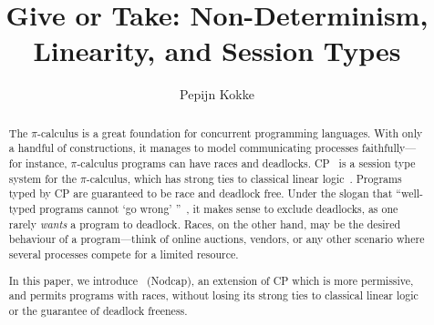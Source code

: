 \documentclass[a4paper,UKenglish]{lipics-v2016}
\title{Give or Take: Non-Determinism, Linearity, and Session Types}%
\author[1]{Pepijn Kokke}%
\affil[1]{LFCS, University of Edinburgh, Edinburgh, United Kingdom\\
  \texttt{pepijn.kokke@ed.ac.uk}}%
\begin{document}
\maketitle

\begin{abstract}
  The $\pi$-calculus is a great foundation for concurrent programming languages.
  With only a handful of constructions, it manages to model communicating
  processes faithfully---for instance, $\pi$-calculus programs can have races
  and deadlocks.
  CP~\cite{wadler2012} is a session type system for the $\pi$-calculus, which
  has strong ties to classical linear logic~\cite{girard1987}. Programs typed by
  CP are guaranteed to be race and deadlock free.
  Under the slogan that ``well-typed programs cannot `go wrong'\!\!
  ''~\cite{milner1978}, it makes sense to exclude deadlocks, as one rarely
  \emph{wants} a program to deadlock.
  Races, on the other hand, may be the desired behaviour of a program---think
  of online auctions, vendors, or any other scenario where several processes
  compete for a limited resource.

  In this paper, we introduce \nodcap\ (Nodcap), an extension of CP which is more
  permissive, and permits programs with races, without losing its strong ties
  to classical linear logic or the guarantee of deadlock freeness.
\end{abstract}
\end{document}
